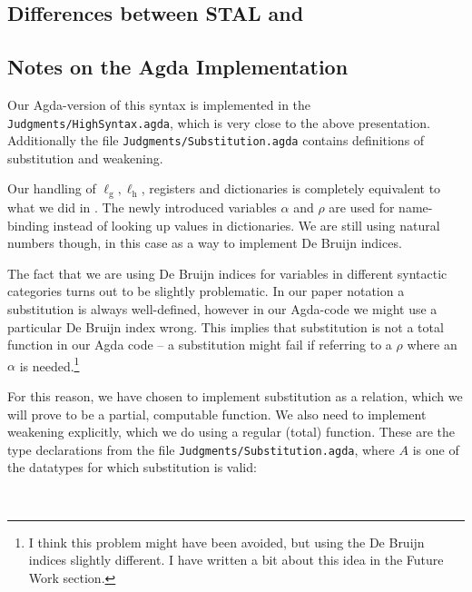 \subsection{Differences between STAL and \ATAL}
\label{sec:rel-stal}


\subsection{Notes on the Agda Implementation}

Our Agda-version of this syntax is implemented in the
\texttt{Judgments/HighSyntax.agda}, which is very close to the above
presentation. Additionally the file \texttt{Judgments/Substitution.agda}
contains definitions of substitution and weakening.

Our handling of $\ell_{\mathrm{g}}, \ell_{\mathrm{h}}$, registers and
dictionaries is completely equivalent to what we did in \ATALe. The newly
introduced variables $\alpha$ and $\rho$ are used for name-binding instead of
looking up values in dictionaries. We are still using natural numbers though, in
this case as a way to implement De Bruijn indices.

The fact that we are using De Bruijn indices for variables in different
syntactic categories turns out to be slightly problematic. In our paper notation
a substitution is always well-defined, however in our Agda-code we might use a
particular De Bruijn index wrong. This implies that substitution is not a total
function in our Agda code -- a substitution might fail if referring to a $\rho$
where an $\alpha$ is needed.\footnote{I think this problem might have been
  avoided, but using the De Bruijn indices slightly different. I have written a
  bit about this idea in the Future Work section.}

For this reason, we have chosen to implement substitution as a relation, which
we will prove to be a partial, computable function. We also need to implement
weakening explicitly, which we do using a regular (total) function. These are
the type declarations from the file \texttt{Judgments/Substitution.agda}, where
$A$ is one of the datatypes for which substitution is valid:

\begin{code}
\>[2]\<[4]%
\>[4] \AgdaSymbol{:}       \<%
\\
\>[2]\<[4]%
\>[4] \AgdaSymbol{:}         \<%
\end{code}

